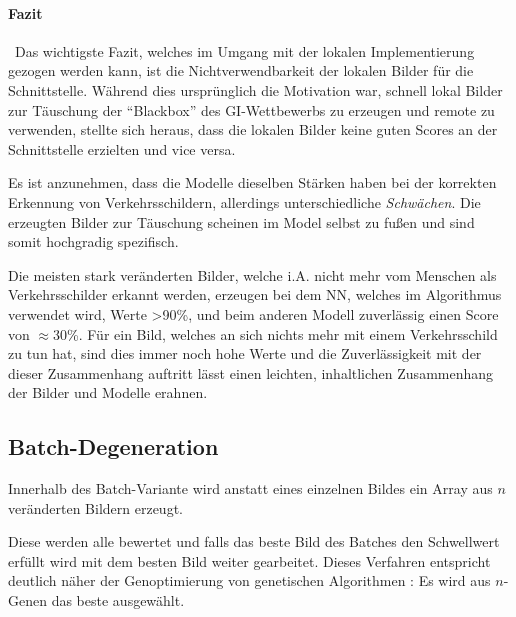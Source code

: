 \paragraph{Fazit}~\newline Das wichtigste Fazit, welches im Umgang mit der lokalen Implementierung gezogen werden kann, ist die Nichtverwendbarkeit der lokalen Bilder für die Schnittstelle. 
Während dies ursprünglich die Motivation war, schnell lokal Bilder zur Täuschung der "`Blackbox"' des \ac{GI}-Wettbewerbs zu erzeugen und remote zu verwenden, stellte sich heraus, dass die lokalen Bilder keine guten Scores an der Schnittstelle erzielten und vice versa. 

Es ist anzunehmen, dass die Modelle dieselben Stärken haben bei der korrekten Erkennung von Verkehrsschildern, allerdings unterschiedliche \textit{Schwächen}. 
Die erzeugten Bilder zur Täuschung scheinen im Model selbst zu fußen und sind somit hochgradig spezifisch. 

Die meisten stark veränderten Bilder, welche i.A. nicht mehr vom Menschen als Verkehrsschilder erkannt werden, erzeugen bei dem \ac{NN}, welches im Algorithmus verwendet wird, Werte >90\%, und beim anderen Modell zuverlässig einen Score von $\approx$30\%. 
Für ein Bild, welches an sich nichts mehr mit einem Verkehrsschild zu tun hat, sind dies immer noch hohe Werte und die Zuverlässigkeit mit der dieser Zusammenhang auftritt lässt einen leichten, inhaltlichen Zusammenhang der Bilder und Modelle erahnen.

\newpage
\subsection{Batch-Degeneration}
Innerhalb des Batch-Variante wird anstatt eines einzelnen Bildes ein Array aus $n$ veränderten Bildern erzeugt. 

Diese werden alle bewertet und falls das beste Bild des Batches den Schwellwert erfüllt wird mit dem besten Bild weiter gearbeitet. 
Dieses Verfahren entspricht deutlich näher der Genoptimierung von genetischen Algorithmen \cite{gerdes2013evolutionare}: 
Es wird aus $n$-Genen das beste ausgewählt. 

